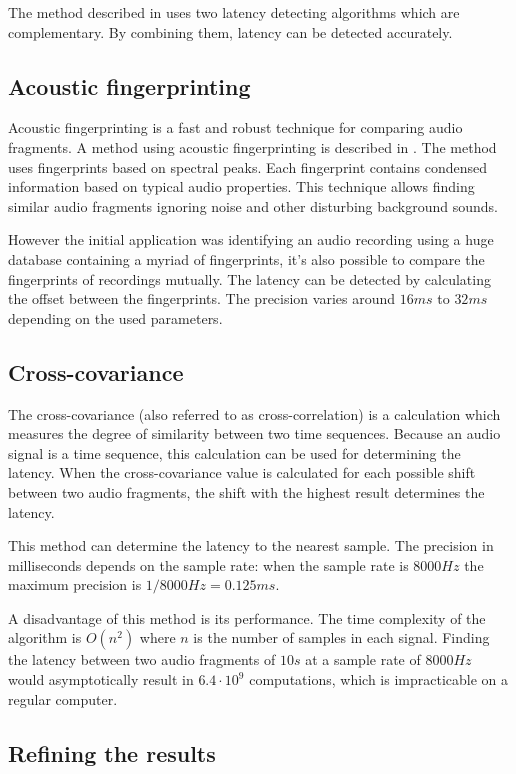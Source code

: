 \documentclass[twocolumn]{phdsymp} %
\begin{document}
The method described in \cite{six2015multimodal} uses two latency detecting algorithms which are complementary. By combining them, latency can be detected accurately.

\subsection{Acoustic fingerprinting}
Acoustic fingerprinting is a fast and robust technique for comparing audio fragments. A method using acoustic fingerprinting is described in \cite{Wang2003a}. The method uses fingerprints based on spectral peaks. Each fingerprint contains condensed information based on typical audio properties. This technique allows finding similar audio fragments ignoring noise and other disturbing background sounds. 

However the initial application was identifying an audio recording using a huge database containing a myriad of fingerprints, it's also possible to compare the fingerprints of recordings mutually. The latency can be detected by calculating the offset between the fingerprints. The precision varies around $16ms$ to $32ms$ depending on the used parameters.

\subsection{Cross-covariance}
The cross-covariance (also referred to as cross-correlation) is a calculation which measures the degree of similarity between two time sequences. Because an audio signal is a time sequence, this calculation can be used for determining the latency. When the cross-covariance value is calculated for each possible shift between two audio fragments, the shift with the highest result determines the latency.

This method can determine the latency to the nearest sample. The precision in milliseconds depends on the sample rate: when the sample rate is $8000Hz$ the maximum precision is $ 1/8000 Hz = 0.125ms $.

A disadvantage of this method is its performance. The time complexity of the algorithm is $ O(n^2) $ where $ n $ is the number of samples in each signal. Finding the latency between two audio fragments of $10s$ at a sample rate of $8000Hz$ would asymptotically result in $ 6.4 \cdot 10^9 $ computations, which is impracticable on a regular computer.

\subsection{Refining the results}
\end{document}
